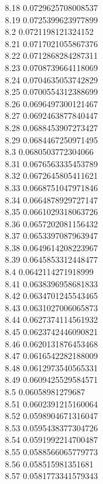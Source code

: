 {8.18	0.0729625708008537\\
8.19	0.0725399623977899\\
8.2	0.0721198121324152\\
8.21	0.0717021055867376\\
8.22	0.0712868284287311\\
8.23	0.0708739664118069\\
8.24	0.0704635053742829\\
8.25	0.0700554312388699\\
8.26	0.0696497300121467\\
8.27	0.0692463877840447\\
8.28	0.0688453907273427\\
8.29	0.0684467250971495\\
8.3	0.0680503772304066\\
8.31	0.0676563335453789\\
8.32	0.0672645805411621\\
8.33	0.0668751047971846\\
8.34	0.0664878929727147\\
8.35	0.0661029318063726\\
8.36	0.0657202081156432\\
8.37	0.0653397087963947\\
8.38	0.0649614208223967\\
8.39	0.0645853312448477\\
8.4	0.0642114271918999\\
8.41	0.0638396958681833\\
8.42	0.0634701245543465\\
8.43	0.0631027006065873\\
8.44	0.0627374114561932\\
8.45	0.0623742446090821\\
8.46	0.0620131876453468\\
8.47	0.0616542282188009\\
8.48	0.0612973540565331\\
8.49	0.0609425529584571\\
8.5	0.06058981279687\\
8.51	0.0602391215160064\\
8.52	0.0598904671316047\\
8.53	0.0595438377304726\\
8.54	0.0591992214700487\\
8.55	0.0588566065779773\\
8.56	0.058515981351681\\
8.57	0.0581773341579343\\
}
